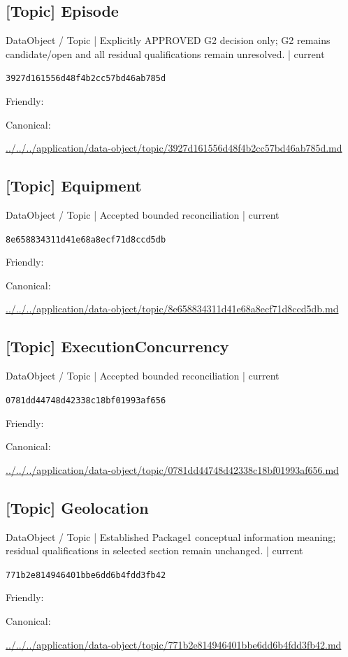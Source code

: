 \documentclass[10pt,a4paper]{article}
\begin{document}
\subsection*{[Topic] Episode}
{\small DataObject / Topic | Explicitly APPROVED G2 decision only; G2 remains candidate/open and all residual qualifications remain unresolved. | current}\par
\texttt{3927d161556d48f4b2cc57bd46ab785d}\par
Friendly: \par
Canonical: \par
{\footnotesize\url{../../../application/data-object/topic/3927d161556d48f4b2cc57bd46ab785d.md}}\par
\subsection*{[Topic] Equipment}
{\small DataObject / Topic | Accepted bounded reconciliation | current}\par
\texttt{8e658834311d41e68a8ecf71d8ccd5db}\par
Friendly: \par
Canonical: \par
{\footnotesize\url{../../../application/data-object/topic/8e658834311d41e68a8ecf71d8ccd5db.md}}\par
\subsection*{[Topic] ExecutionConcurrency}
{\small DataObject / Topic | Accepted bounded reconciliation | current}\par
\texttt{0781dd44748d42338c18bf01993af656}\par
Friendly: \par
Canonical: \par
{\footnotesize\url{../../../application/data-object/topic/0781dd44748d42338c18bf01993af656.md}}\par
\subsection*{[Topic] Geolocation}
{\small DataObject / Topic | Established Package1 conceptual information meaning; residual qualifications in selected section remain unchanged. | current}\par
\texttt{771b2e814946401bbe6dd6b4fdd3fb42}\par
Friendly: \par
Canonical: \par
{\footnotesize\url{../../../application/data-object/topic/771b2e814946401bbe6dd6b4fdd3fb42.md}}\par
\end{document}
